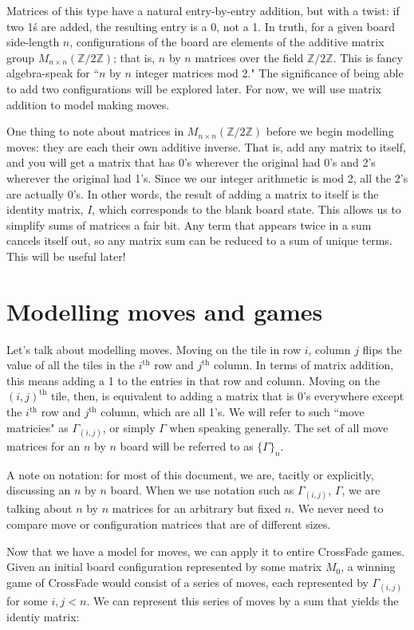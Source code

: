 \documentclass{article}[12pt]
\newcommand{\supt}[1]{^{\text{#1}}}
\newcommand{\gen}[2]{\Gamma_{(#1,#2)}}
\newcommand{\group}[1]{M_{#1 \times #1}(\mathbb{Z}/2\mathbb{Z})}
\begin{document}
Matrices of this type have a natural entry-by-entry addition, but with a twist: if two 1\'s are added, the resulting entry is a 0, not a 1.  In truth, for a given board side-length $n$, configurations of the board are elements of the additive matrix group $\group{n}$; that is, $n$ by $n$ matrices over the field $\mathbb{Z}/2\mathbb{Z}$.  This is fancy algebra-speak for ``$n$ by $n$ integer matrices mod 2."  The significance of being able to add two configurations will be explored later.  For now, we will use matrix addition to model making moves.

One thing to note about matrices in $\group{n}$ before we begin modelling moves: they are each their own additive inverse.  That is, add any matrix to itself, and you will get a matrix that has 0's wherever the original had 0's and 2's wherever the original had 1's.  Since we our integer arithmetic is mod 2, all the 2's are actually 0's.  In other words, the result of adding a matrix to itself is the identity matrix, $I$, which corresponds to the blank board state.  This allows us to simplify sums of matrices a fair bit.  Any term that appears twice in a sum cancels itself out, so any matrix sum can be reduced to a sum of unique terms.  This will be useful later!

\section{Modelling moves and games}

Let's talk about modelling moves.  Moving on the tile in row $i$, column $j$ flips the value of all the tiles in the $i\supt{th}$ row and $j\supt{th}$ column.  In terms of matrix addition, this means adding a 1 to the entries in that row and column.  Moving on the $(i,j)\supt{th}$ tile, then, is equivalent to adding a matrix that is 0's everywhere except the $i\supt{th}$ row and $j\supt{th}$ column, which are all 1's.  We will refer to such ``move matricies" as $\gen{i}{j}$, or simply $\Gamma$ when speaking generally.  The set of all move matrices for an $n$ by $n$ board will be referred to as $\{\Gamma\}_n$.

A note on notation: for most of this document, we are, tacitly or explicitly, discussing an $n$ by $n$ board.  When we use notation such as $\gen{i}{j}$, $\Gamma$, we are talking about $n$ by $n$ matrices for an arbitrary but fixed $n$.  We never need to compare move or configuration matrices that are of different sizes.

Now that we have a model for moves, we can apply it to entire CrossFade games.  Given an initial board configuration represented by some matrix $M_0$, a winning game of CrossFade would consist of a series of moves, each represented by $\gen{i}{j}$ for some $i, j < n$.  We can represent this series of moves by a sum that yields the identiy matrix:
\end{document}
